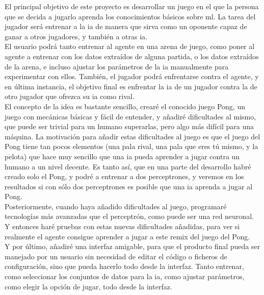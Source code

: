 El principal objetivo de este proyecto es desarrollar un juego en el que la persona que se decida a jugarlo aprenda los conocimientos básicos sobre \gls{ml}. La tarea del jugador será entrenar a la \gls{ia} de manera que sirva como un oponente capaz de ganar a otros jugadores, y también a otras \gls{ia}.
\\
El usuario podrá tanto entrenar al agente en una arena de juego, como poner al agente a entrenar con los datos extraídos de alguna partida, o los datos extraídos de la arena, e incluso ajustar los parámetros de la \gls{ia} manualmente para experimentar con ellos. También, el jugador podrá enfrentarse contra el agente, y en última instancia, el objetivo final es enfrentar la \gls{ia} de un jugador contra la de otro jugador que ofrezca su \gls{ia} como rival. 
\\
El concepto de la idea es bastante sencillo, crearé el conocido juego Pong, un juego con mecánicas básicas y fácil de entender, y añadiré dificultades al mismo, que puede ser trivial para un humano superarlas, pero algo más difícil para una máquina. La motivación para añadir estas dificultades al juego es que el juego del Pong tiene tan pocos elementos (una pala rival, una pala que eres tú mismo, y la pelota) que hace muy sencillo que una \gls{ia} pueda aprender a jugar contra un humano a un nivel decente. Es tanto así, que en una parte del  desarrollo habré creado solo el Pong, y podré a entrenar a dos perceptrones, y veremos en los resultados si con sólo dos perceptrones es posible que una \gls{ia} aprenda a jugar al Pong.
\\
Posteriormente, cuando haya añadido dificultades al juego, programaré tecnologías más avanzadas que el perceptrón, como puede ser una red neuronal. Y entonces haré pruebas con estas nuevas dificultades añadidas, para ver si realmente el agente consigue aprender a jugar a este remix del juego del Pong.
\\
Y por último, añadiré una interfaz amigable, para que el producto final pueda ser manejado por un usuario sin necesidad de editar el código o ficheros de configuración, sino que pueda hacerlo todo desde la interfaz. Tanto entrenar, como seleccionar los conjuntos de datos para la \gls{ia}, como ajustar parámetros, como elegir la opción de jugar, todo desde la interfaz.

